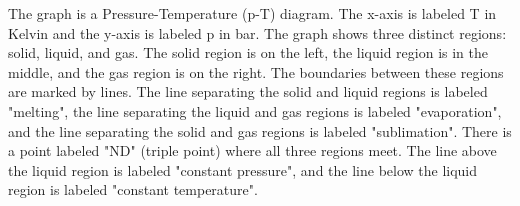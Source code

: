 The graph is a Pressure-Temperature (p-T) diagram. The x-axis is labeled T in Kelvin and the y-axis is labeled p in bar. The graph shows three distinct regions: solid, liquid, and gas. The solid region is on the left, the liquid region is in the middle, and the gas region is on the right. The boundaries between these regions are marked by lines. The line separating the solid and liquid regions is labeled "melting", the line separating the liquid and gas regions is labeled "evaporation", and the line separating the solid and gas regions is labeled "sublimation". There is a point labeled "ND" (triple point) where all three regions meet. The line above the liquid region is labeled "constant pressure", and the line below the liquid region is labeled "constant temperature".